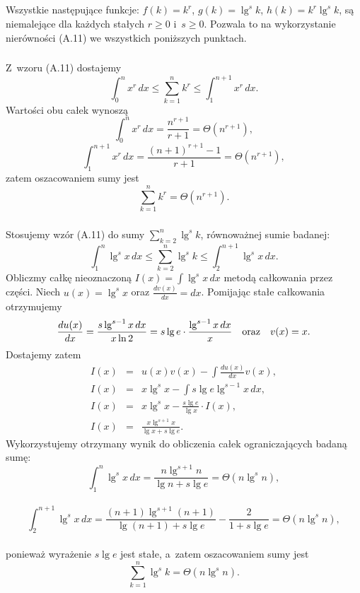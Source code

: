 \problems

\subsection{} %
Wszystkie następujące funkcje: $f(k)=k^r$, $g(k)=\lg^sk$, $h(k)=k^r\lg^sk$, są niemalejące dla każdych stałych $r\ge0$ i~$s\ge0$. Pozwala to na wykorzystanie nierówności (A.11) we wszystkich poniższych punktach.

\subsubsection{} %
Z~wzoru (A.11) dostajemy
\[
	\int_0^nx^r\,dx \le \sum_{k=1}^nk^r \le \int_1^{n+1}x^r\,dx.
\]
Wartości obu całek wynoszą
\[
	\int_0^nx^r\,dx = \frac{n^{r+1}}{r+1} = \Theta(n^{r+1}),
\]
\[
	\int_1^{n+1}x^r\,dx = \frac{(n+1)^{r+1}-1}{r+1} = \Theta(n^{r+1}),
\]
zatem oszacowaniem sumy jest
\[
	\sum_{k=1}^nk^r = \Theta(n^{r+1}).
\]

\subsubsection{} %
Stosujemy wzór (A.11) do sumy $\sum_{k=2}^n\lg^sk$, równoważnej sumie badanej:
\[
	\int_1^n\lg^sx\,dx \le \sum_{k=2}^n\lg^sk \le \int_2^{n+1}\lg^sx\,dx.
\]
Obliczmy całkę nieoznaczoną $I(x) = \int\lg^sx\,dx$ metodą całkowania przez części. Niech $u(x)=\lg^sx$ oraz $\frac{dv(x)}{dx}=dx$. Pomijając stałe całkowania otrzymujemy
\[
	\frac{du(x)}{dx} = \frac{s\lg^{s-1}x\,dx}{x\ln 2} = s\lg e\cdot\frac{\lg^{s-1}x\,dx}{x}\quad\hbox{oraz}\quad v(x)=x.
\]
Dostajemy zatem
\begin{eqnarray*}
	I(x) &=& u(x)v(x)-\int\frac{du(x)}{dx}v(x), \\
	I(x) &=& x\lg^sx-\int s\lg e\lg^{s-1}x\,dx, \\
	I(x) &=& x\lg^sx-\frac{s\lg e}{\lg x}\cdot I(x), \\
	I(x) &=& \frac{x\lg^{s+1}x}{\lg x+s\lg e}.
\end{eqnarray*}
Wykorzystujemy otrzymany wynik do obliczenia całek ograniczających badaną sumę:
\[
	{\int_1^n\lg^sx\,dx} = \frac{n\lg^{s+1}n}{\lg n+s\lg e} = \Theta(n\lg^sn),
\]
\\
\[
	{\int_2^{n+1}\lg^sx\,dx} = \frac{(n+1)\lg^{s+1}(n+1)}{\lg(n+1)+s\lg e}-\dfrac{2}{1+s\lg e} = \Theta(n\lg^sn),
\]
\\
ponieważ wyrażenie $s\lg e$ jest stałe, a~zatem oszacowaniem sumy jest
\[
	\sum_{k=1}^n\lg^sk = \Theta(n\lg^sn).
\]

